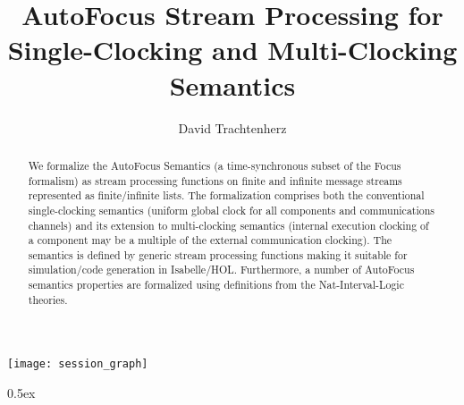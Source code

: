 \documentclass[11pt,a4paper]{article}
\begin{document}
\title{AutoFocus Stream Processing for Single-Clocking and Multi-Clocking Semantics}
\author{David Trachtenherz}
\maketitle

\begin{abstract}
We formalize the AutoFocus Semantics (a time-synchronous subset of the
Focus formalism) as stream processing functions on finite and infinite
message streams represented as finite/infinite lists. The
formalization comprises both the conventional single-clocking
semantics (uniform global clock for all components and communications
channels) and its extension to multi-clocking semantics (internal
execution clocking of a component may be a multiple of the external
communication clocking). The semantics is defined by generic stream
processing functions making it suitable for simulation/code generation
in Isabelle/HOL. Furthermore, a number of AutoFocus semantics
properties are formalized using definitions from the Nat-Interval-Logic
theories.
\end{abstract}

\tableofcontents

\begin{center}
  \texttt{[image: session\_graph]}
\end{center}

\clearpage

\parindent 0pt\parskip 0.5ex

\end{document}
